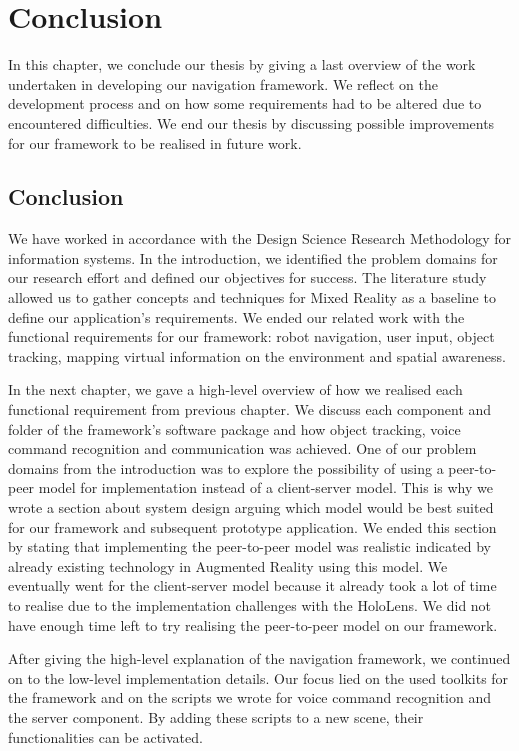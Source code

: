 
\chapter{Conclusion}
In this chapter, we conclude our thesis by giving a last overview of the work undertaken in developing our navigation framework. We reflect on the development process and on how some requirements had to be altered due to encountered difficulties. We end our thesis by discussing possible improvements for our framework to be realised in future work.

\section{Conclusion}
We have worked in accordance with the Design Science Research Methodology for information systems\cite{peffers2007design}. In the introduction, we identified the problem domains for our research effort and defined our objectives for success. The literature study allowed us to gather concepts and techniques for Mixed Reality as a baseline to define our application's requirements. We ended our related work with the functional requirements for our framework: robot navigation, user input, object tracking, mapping virtual information on the environment and spatial awareness. 
\newpage

In the next chapter, we gave a high-level overview of how we realised each functional requirement from previous chapter. We discuss each component and folder of the framework's software package and how object tracking, voice command recognition and communication was achieved. One of our problem domains from the introduction was to explore the possibility of using a peer-to-peer model for implementation instead of a client-server model. This is why we wrote a section about system design arguing which model would be best suited for our framework and subsequent prototype application. We ended this section by stating that implementing the peer-to-peer model was realistic indicated by already existing technology\cite{keller2002toward} in Augmented Reality using this model. We eventually went for the client-server model because it already took a lot of time to realise due to the implementation challenges with the HoloLens. We did not have enough time left to try realising the peer-to-peer model on our framework.

After giving the high-level explanation of the navigation framework, we continued on to the low-level implementation details. Our focus lied on the used toolkits for the framework and on the scripts we wrote for voice command recognition and the server component. By adding these scripts to a new scene, their functionalities can be activated.

